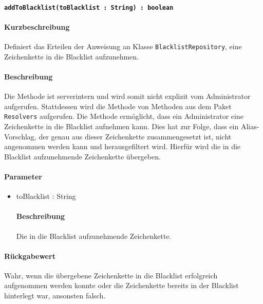 \paragraph{\texttt{addToBlacklist(toBlacklist : String) : boolean}}%
\paragraph*{Kurzbeschreibung}
Definiert das Erteilen der Anweisung an Klasse \texttt{BlacklistRepository}, eine Zeichenkette in die Blacklist aufzunehmen.
\paragraph*{Beschreibung}
Die Methode ist serverintern und wird somit nicht explizit vom Administrator aufgerufen.
Stattdessen wird die Methode von Methoden aus dem Paket \texttt{Resolvers} aufgerufen.
Die Methode ermöglicht, dass ein Administrator eine Zeichenkette in die Blacklist aufnehmen kann.
Dies hat zur Folge, dass ein Alias-Vorschlag, der genau aus dieser Zeichenkette zusammengesetzt ist, nicht angenommen werden kann und herausgefiltert wird.
Hierfür wird die in die Blacklist aufzunehmende Zeichenkette übergeben.
\paragraph*{Parameter}
\begin{itemize}
    \item toBlacklist : String
    		\paragraph*{Beschreibung}
    		Die in die Blacklist aufzunehmende Zeichenkette.
\end{itemize}
\paragraph*{Rückgabewert}
Wahr, wenn die übergebene Zeichenkette in die Blacklist erfolgreich aufgenommen werden konnte oder die Zeichenkette bereits in der Blacklist hinterlegt war, ansonsten falsch.

